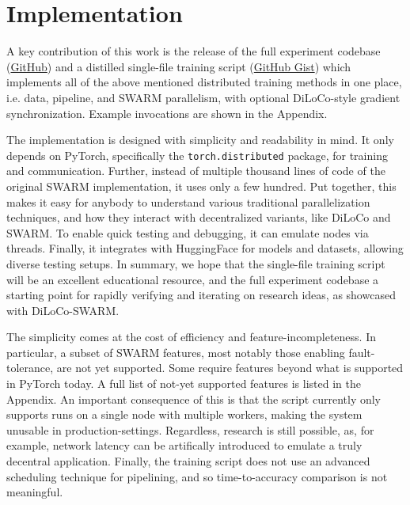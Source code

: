 \documentclass{article}
\newcommand{\github}{\href{https://github.com/mikasenghaas/diloco-swarm}{GitHub}}
\newcommand{\gist}{\href{https://gist.github.com/mikasenghaas/5fa1aa77ea69f187f531a5889983c249}{GitHub Gist}}
\begin{document}
\section{Implementation}


A key contribution of this work is the release of the full experiment codebase
(\github{}) and a distilled single-file training script (\gist{}) which
implements all of the above mentioned distributed training methods in one place,
i.e. data, pipeline, and SWARM parallelism, with optional DiLoCo-style gradient
synchronization. Example invocations are shown in the Appendix.

The implementation is designed with simplicity and readability in mind. It only
depends on PyTorch, specifically the \texttt{torch.distributed} package, for
training and communication. Further, instead of multiple thousand lines of code 
of the original SWARM implementation, it uses only a few hundred. Put together,
this makes it easy for anybody to understand various traditional parallelization
techniques, and how they interact with decentralized variants, like DiLoCo and
SWARM. To enable quick testing and debugging, it can emulate nodes via threads.
Finally, it integrates with HuggingFace for models and datasets, allowing
diverse testing setups. In summary, we hope that the single-file training script
will be an excellent educational resource, and the full experiment codebase a
starting point for rapidly verifying and iterating on research ideas, as
showcased with DiLoCo-SWARM.

The simplicity comes at the cost of efficiency and feature-incompleteness. In
particular, a subset of SWARM features, most notably those enabling
fault-tolerance, are not yet supported. Some require features beyond what is
supported in PyTorch today. A full list of not-yet supported features is listed
in the Appendix. An important consequence of this is that the script currently
only supports runs on a single node with multiple workers, making the system
unusable in production-settings. Regardless, research is still possible, as, for
example, network latency can be artifically introduced to emulate a truly
decentral application. Finally, the training script does not use an advanced
scheduling technique for pipelining, and so time-to-accuracy comparison is not
meaningful.
\end{document}

